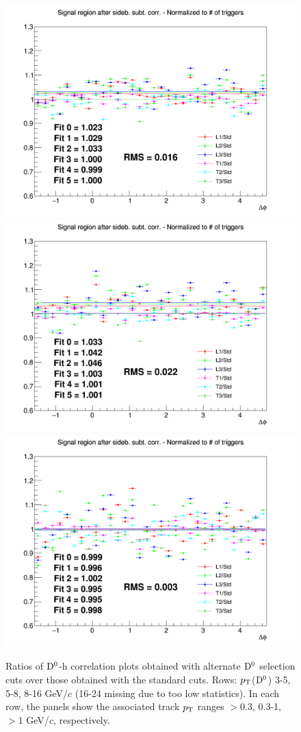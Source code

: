\begin{figure}
{\includegraphics[width=0.31\linewidth]{figuresVsCent/Dzero/SystDcuts/60_100/Ratio_AzimCorrDistr_Dzero_Canvas_PtIntBins9to11_PoolInt_thr03to99.png}}
{\includegraphics[width=0.31\linewidth]{figuresVsCent/Dzero/SystDcuts/60_100/Ratio_AzimCorrDistr_Dzero_Canvas_PtIntBins9to11_PoolInt_thr03to1.png}}
{\includegraphics[width=0.31\linewidth]{figuresVsCent/Dzero/SystDcuts/60_100/Ratio_AzimCorrDistr_Dzero_Canvas_PtIntBins9to11_PoolInt_thr1to99.png}} \\
 \caption{Ratios of ${\rm D^0}$-h correlation plots obtained with alternate ${\rm D^0}$ selection cuts over those obtained with the standard cuts. Rows: $p_{\rm T}$(${\rm D^0}$) 3-5, 5-8, 8-16 GeV/$c$ (16-24 missing due to too low statistics). In each row, the panels show the associated track
$p_{\rm T}$ ranges $> 0.3$, 0.3-1, $> 1$ GeV/$c$, respectively.}
\label{fig:SysDcut60100}
\end{figure}
